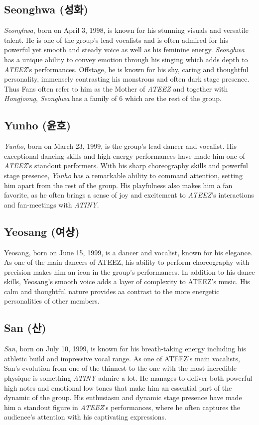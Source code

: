 \documentclass[a4paper,12pt]{article}
\begin{document}
\subsection{Seonghwa (성화)}\label{sec:memberseonghwa}
\textit{Seonghwa}, born on April 3, 1998, is known for his stunning visuals and versatile talent. He is one of the group's lead vocalists and is often admired for his powerful yet smooth and steady voice as well as his feminine energy. \textit{Seonghwa} has a unique ability to convey emotion through his singing which adds depth to \textit{ATEEZ}'s performances. Offstage, he is known for his shy, caring and thoughtful personality, immensely contrasting his monstrous and often dark stage presence. Thus Fans often refer to him as the Mother of \textit{ATEEZ} and together with \textit{Hongjoong}, \textit{Seonghwa} has a family of 6 which are the rest of the group.
\subsection{Yunho (윤호)}\label{sec:memberyunho}
\textit{Yunho}, born on March 23, 1999, is the group's lead dancer and vocalist. His exceptional dancing skills and high-energy performances have made him one of \textit{ATEEZ}'s standout performers. With his sharp choreography skills and powerful stage presence, \textit{Yunho} has a remarkable ability to command attention, setting him apart from the rest of the group. His playfulness also makes him a fan favorite, as he often brings a sense of joy and excitement to \textit{ATEEZ}'s interactions and fan-meetings with \textit{ATINY}.
\subsection{Yeosang (여상)}\label{sec:memberyeosang}
Yeosang, born on June 15, 1999, is a dancer and vocalist, known for his elegance. As one of the main dancers of ATEEZ, his ability to perform choreography with precision makes him an icon in the group’s performances. In addition to his dance skills, Yeosang’s smooth voice adds a layer of complexity to ATEEZ’s music. His calm and thoughtful nature provides aa contrast to the more energetic personalities of other members.
\subsection{San (산)}\label{sec:membersan}
\textit{San}, born on July 10, 1999, is known for his breath-taking energy including his athletic build and impressive vocal range. As one of ATEEZ's main vocalists, San's evolution from one of the thinnest to the one with the most incredible physique is something \textit{ATINY} admire a lot. He manages to deliver both powerful high notes and emotional low tones that make him an essential part of the dynamic of the group. His enthusiasm and dynamic stage presence have made him a standout figure in \textit{ATEEZ}'s performances, where he often captures the audience's attention with his captivating expressions.
\end{document}
